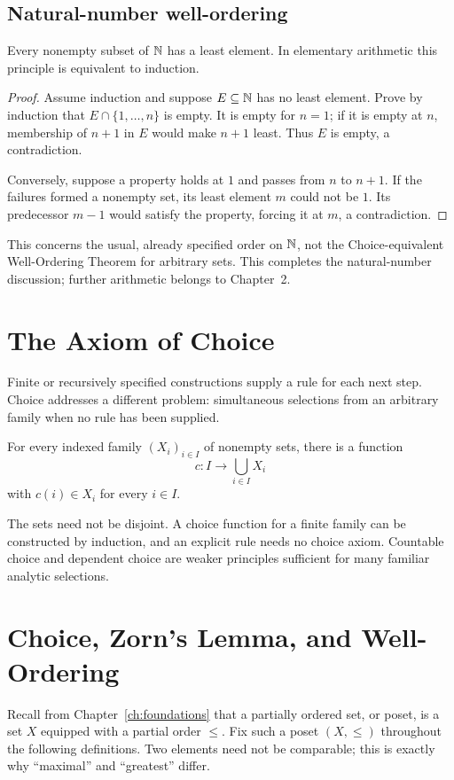\subsection*{Natural-number well-ordering}
\begin{proposition}
\label{prop:natural-well-order}
Every nonempty subset of \(\mathbb{N}\) has a least element. In elementary
arithmetic this principle is equivalent to induction.
\end{proposition}
\begin{proof}
Assume induction and suppose \(E\subseteq\mathbb{N}\) has no least element. Prove
by induction that \(E\cap\{1,\ldots,n\}\) is empty. It is empty for \(n=1\);
if it is empty at \(n\), membership of \(n+1\) in \(E\) would make \(n+1\)
least. Thus \(E\) is empty, a contradiction.

Conversely, suppose a property holds at \(1\) and passes from \(n\) to
\(n+1\). If the failures formed a nonempty set, its least element \(m\)
could not be \(1\). Its predecessor \(m-1\) would satisfy the property,
forcing it at \(m\), a contradiction.
\end{proof}
This concerns the usual, already specified order on \(\mathbb{N}\), not the
Choice-equivalent Well-Ordering Theorem for arbitrary sets. This completes
the natural-number discussion; further arithmetic belongs to Chapter~2.

\section{The Axiom of Choice}
Finite or recursively specified constructions supply a rule for each next
step. Choice addresses a different problem: simultaneous selections from an
arbitrary family when no rule has been supplied.
\begin{definition}\label{def:axiom-choice}
For every indexed family \((X_i)_{i\in I}\) of nonempty sets, there is a
function
\[
c:I\longrightarrow\bigcup_{i\in I}X_i
\]
with \(c(i)\in X_i\) for every \(i\in I\).
\end{definition}
The sets need not be disjoint. A choice function for a finite family can be
constructed by induction, and an explicit rule needs no choice axiom.
Countable choice and dependent choice are weaker principles sufficient for
many familiar analytic selections.

\section{Choice, Zorn's Lemma, and Well-Ordering}
Recall from Chapter~\ref{ch:foundations} that a partially ordered set, or
poset, is a set $X$ equipped with a partial order $\leq$. Fix such a poset
$(X,\leq)$ throughout the following definitions. Two elements need not be
comparable; this is exactly why ``maximal'' and ``greatest'' differ.


